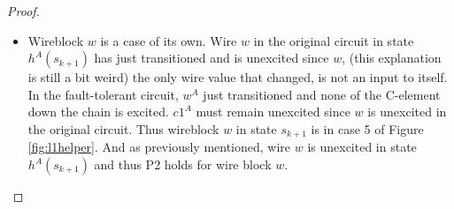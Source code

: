 \documentclass[12pt]{report}
\begin{document}
\begin{proof}
\begin{itemize}
\begin{itemize}
\item
Wireblock $w$ is a case of its own.  Wire $w$ in the original circuit in state $h^A(s_{k+1})$ has just transitioned and is unexcited since $w$, (this explanation is still a bit weird) the only wire value that changed, is not an input to itself.  In the fault-tolerant circuit, $w^A$ just transitioned and none of the C-element down the chain is excited.  $c1^A$ must remain unexcited since $w$ is unexcited in the original circuit.  Thus wireblock $w$ in state $s_{k+1}$ is in case 5 of Figure \ref{fig:l1helper}.  And as previously mentioned, wire $w$ is unexcited in state $h^A(s_{k+1})$ and thus P2 holds for wire block $w$.


\end{itemize}
\end{itemize}
\end{proof}
\end{document}
